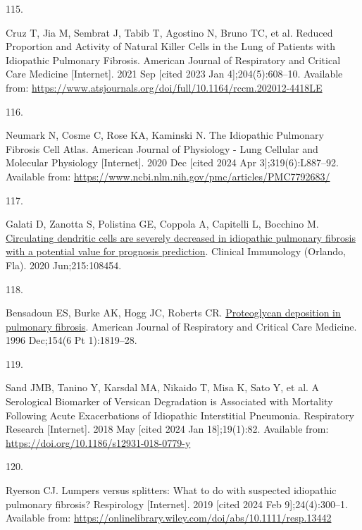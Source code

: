 \documentclass[
]{article}
\newlength{\cslhangindent}
\newlength{\csllabelwidth}
\newenvironment{CSLReferences}[2] %
 {\begin{list}{}{%
  \setlength{\itemindent}{0pt}
  \setlength{\leftmargin}{0pt}
  \setlength{\parsep}{0pt}
  \ifodd #1
   \setlength{\leftmargin}{\cslhangindent}
   \setlength{\itemindent}{-1\cslhangindent}
  \fi
  \setlength{\itemsep}{#2\baselineskip}}}
 {\end{list}}
\newcommand{\CSLLeftMargin}[1]{\parbox[t]{\csllabelwidth}{\strut#1\strut}}
\newcommand{\CSLRightInline}[1]{\parbox[t]{\linewidth - \csllabelwidth}{\strut#1\strut}}
\begin{document}
\begin{CSLReferences}{0}{1}
\CSLLeftMargin{115. }%
\CSLRightInline{Cruz T, Jia M, Sembrat J, Tabib T, Agostino N, Bruno TC, et al. Reduced {Proportion} and {Activity} of {Natural} {Killer} {Cells} in the {Lung} of {Patients} with {Idiopathic} {Pulmonary} {Fibrosis}. American Journal of Respiratory and Critical Care Medicine {[}Internet{]}. 2021 Sep {[}cited 2023 Jan 4{]};204(5):608--10. Available from: \url{https://www.atsjournals.org/doi/full/10.1164/rccm.202012-4418LE}}

\CSLLeftMargin{116. }%
\CSLRightInline{Neumark N, Cosme C, Rose KA, Kaminski N. The {Idiopathic} {Pulmonary} {Fibrosis} {Cell} {Atlas}. American Journal of Physiology - Lung Cellular and Molecular Physiology {[}Internet{]}. 2020 Dec {[}cited 2024 Apr 3{]};319(6):L887--92. Available from: \url{https://www.ncbi.nlm.nih.gov/pmc/articles/PMC7792683/}}

\CSLLeftMargin{117. }%
\CSLRightInline{Galati D, Zanotta S, Polistina GE, Coppola A, Capitelli L, Bocchino M. \href{https://doi.org/10.1016/j.clim.2020.108454}{Circulating dendritic cells are severely decreased in idiopathic pulmonary fibrosis with a potential value for prognosis prediction}. Clinical Immunology (Orlando, Fla). 2020 Jun;215:108454. }

\CSLLeftMargin{118. }%
\CSLRightInline{Bensadoun ES, Burke AK, Hogg JC, Roberts CR. \href{https://doi.org/10.1164/ajrccm.154.6.8970376}{Proteoglycan deposition in pulmonary fibrosis}. American Journal of Respiratory and Critical Care Medicine. 1996 Dec;154(6 Pt 1):1819--28. }

\CSLLeftMargin{119. }%
\CSLRightInline{Sand JMB, Tanino Y, Karsdal MA, Nikaido T, Misa K, Sato Y, et al. A {Serological} {Biomarker} of {Versican} {Degradation} is {Associated} with {Mortality} {Following} {Acute} {Exacerbations} of {Idiopathic} {Interstitial} {Pneumonia}. Respiratory Research {[}Internet{]}. 2018 May {[}cited 2024 Jan 18{]};19(1):82. Available from: \url{https://doi.org/10.1186/s12931-018-0779-y}}

\CSLLeftMargin{120. }%
\CSLRightInline{Ryerson CJ. Lumpers versus splitters: {What} to do with suspected idiopathic pulmonary fibrosis? Respirology {[}Internet{]}. 2019 {[}cited 2024 Feb 9{]};24(4):300--1. Available from: \url{https://onlinelibrary.wiley.com/doi/abs/10.1111/resp.13442}}


\end{CSLReferences}
\end{document}
